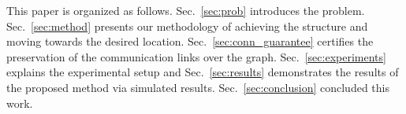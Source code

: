 \documentclass[conference]{IEEEconf}
\theoremstyle{plain}
\begin{document}
This paper is organized as follows. Sec.~\ref{sec:prob} introduces the problem. Sec.~\ref{sec:method} presents our methodology of achieving the structure and moving towards the desired location. Sec.~\ref{sec:conn_guarantee} certifies the preservation of the communication links over the graph. Sec.~\ref{sec:experiments} explains the experimental setup and Sec.~\ref{sec:results} demonstrates the results of the proposed method via simulated results. Sec.~\ref{sec:conclusion} concluded this work. %




\end{document}
